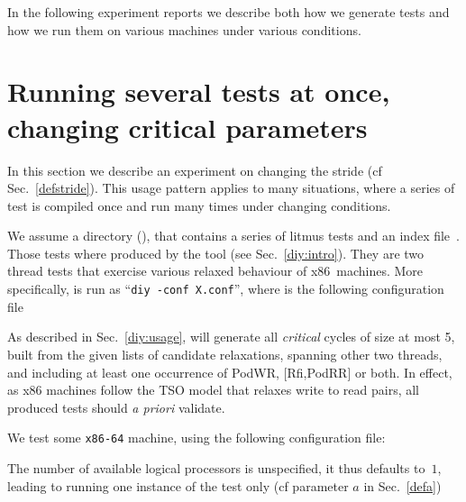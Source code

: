 In the following experiment reports we describe both how we generate tests
and how we run them on various machines under various conditions.

\section{Running several tests at once, changing critical parameters}
In this section we describe an experiment on changing the stride
(cf Sec.~\ref{defstride}).
This usage pattern applies to many situations, where a series of
test is compiled once and run many times under changing conditions.

We assume a directory %
\ifhevea{} ()\fi,
that contains a series of litmus tests
and an index file~.
Those tests where produced by the \diy{} tool (see Sec.~\ref{diy:intro}).
They are two thread tests that exercise various relaxed behaviour
of x86~machines.
More specifically, \diy{} is run as ``\texttt{diy -conf X.conf}'',
where  is the
following configuration file

As described in Sec.~\ref{diy:usage}, \diy{} will generate all
\emph{critical} cycles of size at most 5, built from the given lists
of candidate relaxations, spanning other two threads,
and including at least one occurrence of PodWR, [Rfi,PodRR] or both.
In effect, as x86 machines follow the TSO model that relaxes write to read
pairs, all produced tests should \emph{a priori} validate.


We test some \texttt{x86-64} machine, using the following
 \litmus{} configuration file:

The number of available logical processors is unspecified,
it thus defaults to~$1$,
leading to running one instance of the test only (cf parameter $a$ in Sec.~\ref{defa})

